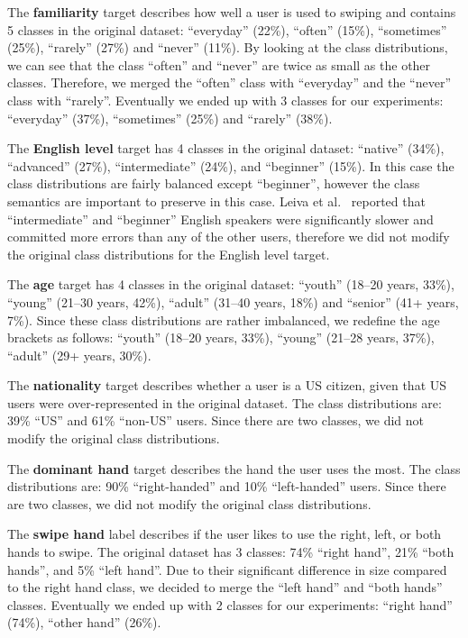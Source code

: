\documentclass[sn-mathphys, pdflatex]{sn-jnl}
\begin{document}
The \textbf{familiarity} target describes how well a user is used to swiping and contains 5 classes in the original dataset:
``everyday'' (22\%), ``often'' (15\%), ``sometimes'' (25\%), ``rarely'' (27\%) and ``never'' (11\%).
By looking at the class distributions, we can see that the class ``often'' and ``never'' are twice as small as the other classes.
Therefore, we merged the ``often'' class with ``everyday'' and the ``never'' class with ``rarely''.
Eventually we ended up with 3 classes for our experiments: ``everyday'' (37\%), ``sometimes'' (25\%) and ``rarely'' (38\%).

The \textbf{English level} target has 4 classes in the original dataset:
``native'' (34\%), ``advanced'' (27\%), ``intermediate'' (24\%), and ``beginner'' (15\%).
In this case the class distributions are fairly balanced except ``beginner'',
however the class semantics are important to preserve in this case.
Leiva et al.~\cite{Leiva21_swipe} reported that ``intermediate'' and ``beginner'' English speakers
were significantly slower and committed more errors than any of the other users,
therefore we did not modify the original class distributions for the English level target.

The \textbf{age} target has 4 classes in the original dataset:
``youth'' (18--20 years, 33\%),
``young'' (21--30 years, 42\%),
``adult'' (31--40 years, 18\%)
and ``senior'' (41+ years, 7\%).
Since these class distributions are rather imbalanced,
we redefine the age brackets as follows:
``youth'' (18--20 years, 33\%),
``young'' (21--28 years, 37\%),
``adult'' (29+ years, 30\%).

The \textbf{nationality} target describes whether a user is a US citizen,
given that US users were over-represented in the original dataset.
The class distributions are: 39\% ``US'' and 61\% ``non-US'' users.
Since there are two classes, we did not modify the original class distributions.

The \textbf{dominant hand} target describes the hand the user uses the most.
The class distributions are: 90\% ``right-handed'' and 10\% ``left-handed'' users.
Since there are two classes, we did not modify the original class distributions.

The \textbf{swipe hand} label describes if the user likes to use the right, left, or both hands to swipe.
The original dataset has 3 classes: 74\% ``right hand'', 21\% ``both hands'', and 5\% ``left hand''.
Due to their significant difference in size compared to the right hand class,
we decided to merge the ``left hand'' and ``both hands'' classes.
Eventually we ended up with 2 classes for our experiments:
``right hand'' (74\%), ``other hand'' (26\%).
\end{document}
